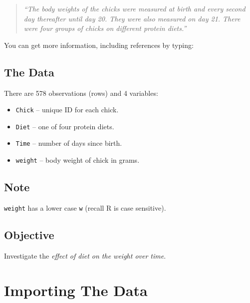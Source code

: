 \documentclass[a4paper,9pt,twocolumn,twoside,printwatermark=false]{pinp}
\providecommand{\tightlist}{%
  \setlength{\itemsep}{0pt}\setlength{\parskip}{0pt}}
\begin{document}
\begin{quote}
\emph{``The body weights of the chicks were measured at birth and every
second day thereafter until day 20. They were also measured on day 21.
There were four groups of chicks on different protein diets.''}
\end{quote}

You can get more information, including references by typing:

\begin{Shaded}
\begin{Highlighting}[]
\NormalTok{(}\NormalTok{)}
\end{Highlighting}
\end{Shaded}

\subsection{The Data}\label{the-data}

There are 578 observations (rows) and 4 variables:

\begin{itemize}
\tightlist
\item
  \texttt{Chick} -- unique ID for each chick.
\item
  \texttt{Diet} -- one of four protein diets.
\item
  \texttt{Time} -- number of days since birth.
\item
  \texttt{weight} -- body weight of chick in grams.
\end{itemize}

\subsection{Note}\label{note}

\texttt{weight} has a lower case \texttt{w} (recall R is case
sensitive).

\subsection{Objective}\label{objective}

Investigate the \emph{effect of diet on the weight over time}.

\section{Importing The Data}\label{importing-the-data}
\end{document}

